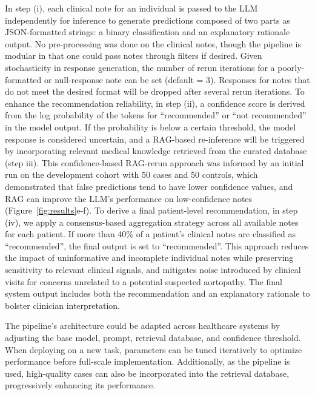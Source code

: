 \documentclass[fleqn,10pt]{wlscirep}
\begin{document}




In step (i), each clinical note for an individual is passed to the LLM independently for inference to generate predictions composed of two parts as JSON-formatted strings: a binary classification and an explanatory rationale output. No pre-processing was done on the clinical notes, though the pipeline is modular in that one could pass notes through filters if desired. Given stochasticity in response generation, the number of rerun iterations for a poorly-formatted or null-response note can be set (default = 3). Responses for notes that do not meet the desired format will be dropped after several rerun iterations. To enhance the recommendation reliability, in step (ii), a confidence score is derived from the log probability of the tokens for “recommended” or “not recommended” in the model output. If the probability is below a certain threshold, the model response is considered uncertain, and a RAG-based re-inference will be triggered by incorporating relevant medical knowledge retrieved from the curated database (step iii). This confidence-based RAG-rerun approach was informed by an initial run on the development cohort with 50 cases and 50 controls, which demonstrated that false predictions tend to have lower confidence values, and RAG can improve the LLM’s performance on low-confidence notes (Figure~\ref{fig:results}e-f). To derive a final patient-level recommendation, in step (iv), we apply a consensus-based aggregation strategy across all available notes for each patient. If more than 40\% of a patient’s clinical notes are classified as ``recommended'', the final output is set to ``recommended''. This approach reduces the impact of uninformative and incomplete individual notes while preserving sensitivity to relevant clinical signals, and mitigates noise introduced by clinical visits for concerns unrelated to a potential suspected aortopathy. The final system output includes both the recommendation and an explanatory rationale to bolster clinician interpretation.

The pipeline's architecture could be adapted across healthcare systems by adjusting the base model, prompt, retrieval database, and confidence threshold. When deploying on a new task, parameters can be tuned iteratively to optimize performance before full-scale implementation. Additionally, as the pipeline is used, high-quality cases can also be incorporated into the retrieval database, progressively enhancing its performance.
\end{document}

